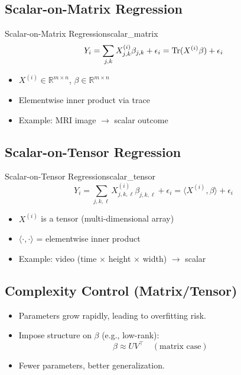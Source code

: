 \subsection{Scalar-on-Matrix Regression}

\begin{defn}{Scalar-on-Matrix Regression}{scalar_matrix}
\[
Y_i = \sum_{j,k} X^{(i)}_{j,k}\beta_{j,k} + \epsilon_i = \operatorname{Tr}(X^{(i)}\beta) + \epsilon_i
\]

\begin{itemize}
\item $X^{(i)} \in \mathbb{R}^{m \times n}$, $\beta \in \mathbb{R}^{m \times n}$
\item Elementwise inner product via trace
\item Example: MRI image $\rightarrow$ scalar outcome
\end{itemize}
\end{defn}

\subsection{Scalar-on-Tensor Regression}

\begin{defn}{Scalar-on-Tensor Regression}{scalar_tensor}
\[
Y_i = \sum_{j,k,\ell} X^{(i)}_{j,k,\ell}\beta_{j,k,\ell} + \epsilon_i = \langle X^{(i)}, \beta \rangle + \epsilon_i
\]

\begin{itemize}
\item $X^{(i)}$ is a tensor (multi-dimensional array)
\item $\langle \cdot,\cdot \rangle$ = elementwise inner product
\item Example: video (time $\times$ height $\times$ width) $\rightarrow$ scalar
\end{itemize}
\end{defn}

\subsection{Complexity Control (Matrix/Tensor)}

\begin{notebox}
\begin{itemize}
\item Parameters grow rapidly, leading to overfitting risk.
\item Impose structure on $\beta$ (e.g., low-rank):
\[
\beta \approx UV^\top \quad (\text{matrix case})
\]

\item Fewer parameters, better generalization.
\end{itemize}
\end{notebox}

